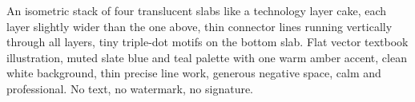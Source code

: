 An isometric stack of four translucent slabs like a technology layer cake, each layer slightly wider than the one above, thin connector lines running vertically through all layers, tiny triple-dot motifs on the bottom slab. Flat vector textbook illustration, muted slate blue and teal palette with one warm amber accent, clean white background, thin precise line work, generous negative space, calm and professional. No text, no watermark, no signature.
